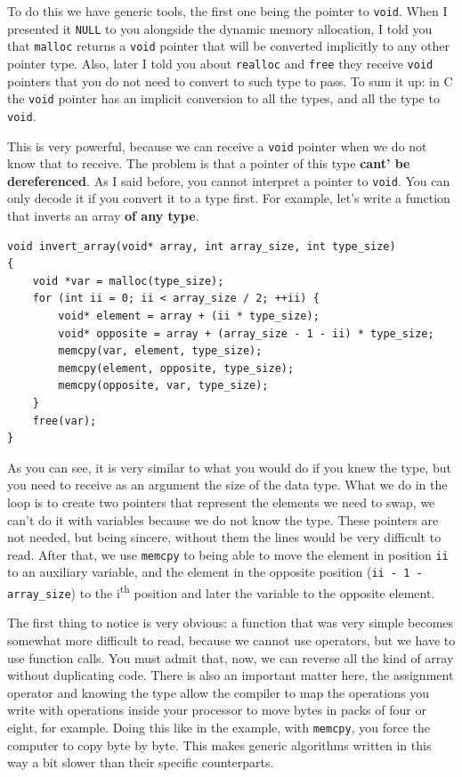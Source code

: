 \documentclass[a4paper]{article}
\begin{document}
To do this we have generic tools, the first one being the pointer to
\verb!void!. When I presented it \verb!NULL! to you alongside the dynamic memory
allocation, I told you that \verb!malloc! returns a \verb!void! pointer that
will be converted implicitly to any other pointer type. Also, later I told you
about \verb!realloc! and \verb!free! they receive \verb!void! pointers that you
do not need to convert to such type to pass. To sum it up: in C the \verb!void!
pointer has an implicit conversion to all the types, and all the type to
\verb!void!.

This is very powerful, because we can receive a \verb!void! pointer when we do
not know that to receive. The problem is that a pointer of this type \textbf{
cant' be dereferenced}. As I said before, you cannot interpret a pointer to
\verb!void!. You can only decode it if you convert it to a type first. For
example, let's write a function that inverts an array \textbf{of any type}.

\noindent
\begin{minipage}[H]{\linewidth}
\mbox{}
\begin{lstlisting}[style=C,
caption={Inversion of an array of any type},
label={lst:genericArrayInversion}]
void invert_array(void* array, int array_size, int type_size)
{
    void *var = malloc(type_size);
    for (int ii = 0; ii < array_size / 2; ++ii) {
        void* element = array + (ii * type_size);
        void* opposite = array + (array_size - 1 - ii) * type_size;
        memcpy(var, element, type_size);
        memcpy(element, opposite, type_size);
        memcpy(opposite, var, type_size);
    }
    free(var);
}
\end{lstlisting}
\end{minipage}

As you can see, it is very similar to what you would do if you knew the type,
but you need to receive as an argument the size of the data type. What we do in
the loop is to create two pointers that represent the elements we need to swap,
we can't do it with variables because we do not know the type. These pointers
are not needed, but being sincere, without them the lines would be very
difficult to read. After that, we use \verb!memcpy! to being able to move the
element in position \verb!ii! to an auxiliary variable, and the element in the
opposite position (\verb!ii - 1 - array_size!) to the i\textsuperscript{th}
position and later the variable to the opposite element.

The first thing to notice is very obvious: a function that was very simple
becomes somewhat more difficult to read, because we cannot use operators, but we
have to use function calls. You must admit that, now, we can reverse all the
kind of array without duplicating code. There is also an important matter here,
the assignment operator and knowing the type allow the compiler to map the
operations you write with operations inside your processor to move bytes
in packs of four or eight, for example. Doing this like in the example, with
\verb!memcpy!, you force the computer to copy byte by byte. This makes generic
algorithms written in this way a bit slower than their specific counterparts.
\end{document}
